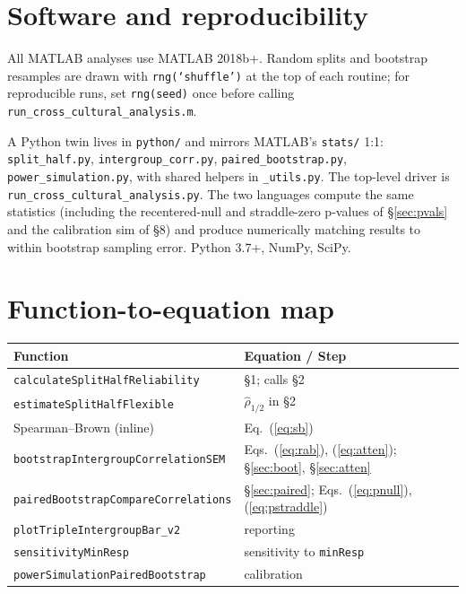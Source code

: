 \documentclass[11pt]{article}
\begin{document}
\section{Software and reproducibility}
All MATLAB analyses use MATLAB 2018b+. Random splits and bootstrap resamples are drawn with \texttt{rng(`shuffle')} at the top of each routine; for reproducible runs, set \texttt{rng(seed)} once before calling \texttt{run\_cross\_cultural\_analysis.m}.

A Python twin lives in \texttt{python/} and mirrors MATLAB's \texttt{stats/} 1:1: \texttt{split\_half.py}, \texttt{intergroup\_corr.py}, \texttt{paired\_bootstrap.py}, \texttt{power\_simulation.py}, with shared helpers in \texttt{\_utils.py}. The top-level driver is \texttt{run\_cross\_cultural\_analysis.py}. The two languages compute the same statistics (including the recentered-null and straddle-zero p-values of \S\ref{sec:pvals} and the calibration sim of \S8) and produce numerically matching results to within bootstrap sampling error. Python 3.7+, NumPy, SciPy.

\appendix
\section{Function-to-equation map}
\begin{center}
\begin{tabular}{ll}
\toprule
Function & Equation / Step \\
\midrule
\texttt{calculateSplitHalfReliability} & \S1; calls \S2 \\
\texttt{estimateSplitHalfFlexible}      & $\hat\rho_{1/2}$ in \S2 \\
Spearman--Brown (inline)                & Eq.~(\ref{eq:sb}) \\
\texttt{bootstrapIntergroupCorrelationSEM} & Eqs.~(\ref{eq:rab}), (\ref{eq:atten}); \S\ref{sec:boot}, \S\ref{sec:atten} \\
\texttt{pairedBootstrapCompareCorrelations} & \S\ref{sec:paired}; Eqs.~(\ref{eq:pnull}), (\ref{eq:pstraddle}) \\
\texttt{plotTripleIntergroupBar\_v2}    & reporting \\
\texttt{sensitivityMinResp}             & sensitivity to \texttt{minResp} \\
\texttt{powerSimulationPairedBootstrap} & calibration \\
\bottomrule
\end{tabular}
\end{center}
\end{document}
